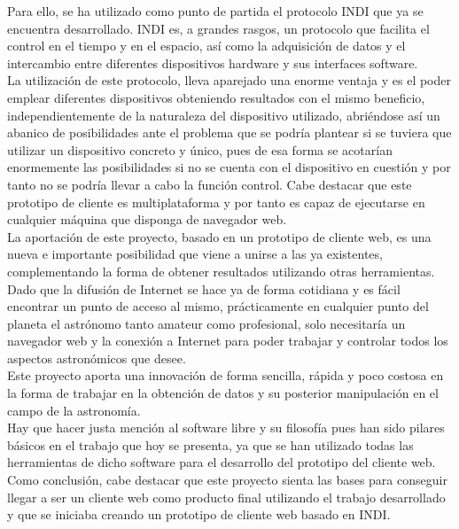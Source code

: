 Para ello, se ha utilizado como punto de partida el protocolo INDI que ya se encuentra desarrollado. INDI es, a grandes rasgos, un protocolo que facilita el control en el tiempo y en el espacio, así como la adquisición de datos y el intercambio entre diferentes dispositivos hardware y sus interfaces software.\\
La utilización de este protocolo, lleva aparejado una enorme ventaja y es el poder emplear diferentes dispositivos obteniendo resultados con el mismo beneficio, independientemente de la naturaleza del dispositivo utilizado, abriéndose así un abanico de posibilidades ante el problema que se podría plantear si se tuviera que utilizar un dispositivo concreto y único, pues de esa forma se acotarían enormemente las posibilidades si no se cuenta con el dispositivo en cuestión y por tanto no se podría llevar a cabo la función control. Cabe destacar que este prototipo de cliente es multiplataforma y por tanto es capaz de ejecutarse en cualquier máquina que disponga de navegador web.\\

La aportación de este proyecto, basado en un prototipo de cliente web, es una nueva e importante posibilidad  que viene a unirse a las ya existentes, complementando la forma de obtener resultados utilizando otras herramientas. \\

Dado que la difusión de Internet se hace ya de forma cotidiana y es fácil encontrar un punto de acceso al mismo, prácticamente en cualquier punto del planeta el astrónomo tanto amateur como  profesional, solo necesitaría un navegador web y la conexión a Internet para poder trabajar y controlar todos los aspectos astronómicos que desee.\\

Este proyecto aporta una innovación de forma sencilla, rápida y poco costosa en la forma de trabajar en la obtención de datos y su posterior manipulación en el campo de la astronomía.\\

Hay que hacer justa mención al software libre y su filosofía pues han sido pilares básicos en el trabajo que hoy se presenta, ya que se han utilizado todas las herramientas de dicho software para el desarrollo del prototipo del cliente web.\\

Como conclusión, cabe destacar que este proyecto sienta las bases para conseguir llegar a ser un cliente web como producto final utilizando el trabajo desarrollado y que se iniciaba creando un prototipo de cliente web basado en INDI. \\


